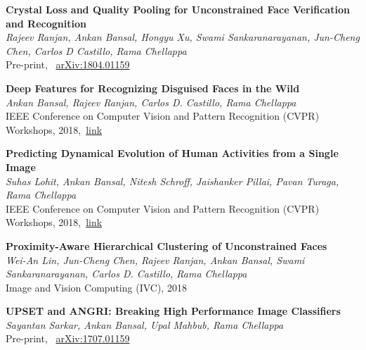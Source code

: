 \documentclass[11pt, a4paper]{article}
\begin{document}
\vspace{4pt}

\textbf{Crystal Loss and Quality Pooling for Unconstrained Face Verification and Recognition} \\
\textit{Rajeev Ranjan, Ankan Bansal, Hongyu Xu, Swami Sankaranarayanan, Jun-Cheng Chen, Carlos D
Castillo, Rama Chellappa}\\
Pre-print, ~\href{https://arxiv.org/abs/1804.01159}{arXiv:1804.01159}

\vspace{4pt}

\textbf{Deep Features for Recognizing Disguised Faces in the Wild} \\
\textit{Ankan Bansal, Rajeev Ranjan, Carlos D. Castillo, Rama Chellappa}\\
IEEE Conference on Computer Vision and Pattern Recognition (CVPR) Workshops,
2018,~\href{http://openaccess.thecvf.com/content_cvpr_2018_workshops/w1/html/Bansal_Deep_Features_for_CVPR_2018_paper.html}{link}

\vspace{4pt}

\textbf{Predicting Dynamical Evolution of Human Activities from a Single Image} \\
\textit{Suhas Lohit, Ankan Bansal, Nitesh Schroff, Jaishanker Pillai, Pavan Turaga, Rama
Chellappa}\\
IEEE Conference on Computer Vision and Pattern Recognition (CVPR) Workshops,
2018,~\href{http://openaccess.thecvf.com/content_cvpr_2018_workshops/w10/html/Lohit_Predicting_Dynamical_Evolution_CVPR_2018_paper.html}{link}

\vspace{4pt}

\textbf{Proximity-Aware Hierarchical Clustering of Unconstrained Faces} \\
\textit{Wei-An Lin, Jun-Cheng Chen, Rajeev Ranjan, Ankan Bansal, Swami Sankaranarayanan, Carlos D.
Castillo, Rama Chellappa}\\
Image and Vision Computing (IVC), 2018

\vspace{4pt}

\textbf{UPSET and ANGRI: Breaking High Performance Image Classifiers} \\
\textit{Sayantan Sarkar, Ankan Bansal, Upal Mahbub, Rama Chellappa}\\
Pre-print, ~\href{https://arxiv.org/abs/1707.01159}{arXiv:1707.01159}
\end{document}
